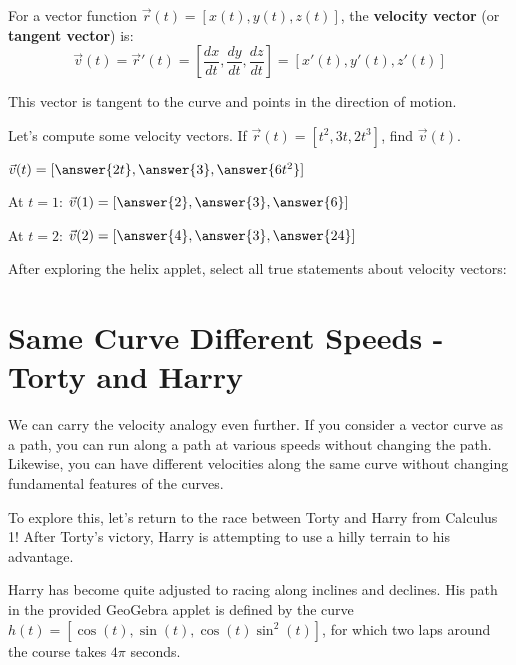 \documentclass{ximera}
\begin{document}
\begin{definition}
For a vector function $\vec{r}(t) = [x(t), y(t), z(t) ]$, the \textbf{velocity vector} (or \textbf{tangent vector}) is:
$$\vec{v}(t) = \vec{r}'(t) = [ \frac{dx}{dt}, \frac{dy}{dt}, \frac{dz}{dt} ] = [ x'(t), y'(t), z'(t) ]$$

This vector is tangent to the curve and points in the direction of motion.
\end{definition}

\begin{problem}
Let's compute some velocity vectors. If $\vec{r}(t) = [ t^2, 3t, 2t^3 ]$, find $\vec{v}(t)$.

$\vec{v}(t) = [ \answer{2t}, \answer{3}, \answer{6t^2} ]$

At $t=1$: $\vec{v}(1) = [ \answer{2}, \answer{3}, \answer{6} ]$

At $t=2$: $\vec{v}(2) = [ \answer{4}, \answer{3}, \answer{24} ]$
\end{problem}

\begin{problem}
After exploring the helix applet, select all true statements about velocity vectors:
\begin{selectAll}
\end{selectAll}
\end{problem}

\section*{Same Curve Different Speeds - Torty and Harry}

We can carry the velocity analogy even further. If you consider a vector curve as a path, you can run along a path at various speeds without changing the path. Likewise, you can have different velocities along the same curve without changing fundamental features of the curves.

To explore this, let's return to the race between Torty and Harry from Calculus 1! After Torty's victory, Harry is attempting to use a hilly terrain to his advantage.

Harry has become quite adjusted to racing along inclines and declines. His path in the provided GeoGebra applet is defined by the curve $h(t)=[ \cos(t), \sin(t), \cos(t)\sin^2(t)]$, for which two laps around the course takes $4 \pi$ seconds.
\end{document}
